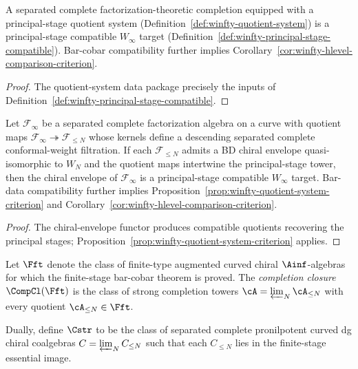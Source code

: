 \begin{proposition}
\label{prop:winfty-quotient-system-criterion}
A separated complete factorization-theoretic completion equipped with a
principal-stage quotient system
(Definition~\ref{def:winfty-quotient-system}) is a principal-stage
compatible $W_\infty$ target
(Definition~\ref{def:winfty-principal-stage-compatible}).
Bar-cobar compatibility further implies
Corollary~\ref{cor:winfty-hlevel-comparison-criterion}.
\end{proposition}

\begin{proof}
The quotient-system data package precisely the inputs of Definition~\ref{def:winfty-principal-stage-compatible}.
\end{proof}

\begin{proposition}
\label{prop:winfty-factorization-envelope-criterion}
Let $\mathcal{F}_\infty$ be a separated complete factorization algebra
on a curve with quotient maps
$\mathcal{F}_\infty \twoheadrightarrow \mathcal{F}_{\le N}$
whose kernels define a descending separated complete conformal-weight
filtration. If each $\mathcal{F}_{\le N}$ admits a BD chiral envelope
quasi-isomorphic to $W_N$ and the quotient maps intertwine the
principal-stage tower, then the chiral envelope of
$\mathcal{F}_\infty$ is a principal-stage compatible $W_\infty$ target.
Bar-data compatibility further implies
Proposition~\ref{prop:winfty-quotient-system-criterion} and
Corollary~\ref{cor:winfty-hlevel-comparison-criterion}.
\end{proposition}

\begin{proof}
The chiral-envelope functor produces compatible quotients recovering the principal stages; Proposition~\ref{prop:winfty-quotient-system-criterion} applies.
\end{proof}


\begin{definition}
\label{def:completion-closure}
Let $\Fft$ denote the class of finite-type augmented curved chiral
$\Ainf$-algebras for which the finite-stage bar-cobar theorem is proved.
The \emph{completion closure} $\CompCl(\Fft)$ is the class of strong
completion towers $\cA = \varprojlim_N \cA_{\le N}$ with every quotient
$\cA_{\le N} \in \Fft$.

Dually, define $\Cstr$ to be the class of separated complete pronilpotent
curved dg chiral coalgebras $C = \varprojlim_N C_{\le N}$ such that each
$C_{\le N}$ lies in the finite-stage essential image.
\end{definition}

